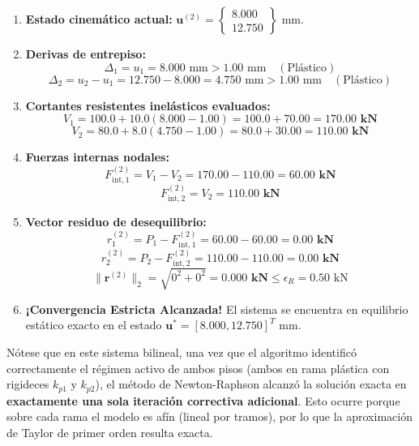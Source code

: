 \documentclass[11pt,letterpaper]{article}
\begin{document}
\begin{stepbox}
\begin{enumerate}
    \item \textbf{Estado cinemático actual:} $\mathbf{u}^{(2)} = \begin{Bmatrix} 8.000 \\ 12.750 \end{Bmatrix}\text{ mm}$.
    \item \textbf{Derivas de entrepiso:}
    \[
        \Delta_1 = u_1 = 8.000\text{ mm} > 1.00\text{ mm} \quad (\text{Plástico})
    \]
    \[
        \Delta_2 = u_2 - u_1 = 12.750 - 8.000 = 4.750\text{ mm} > 1.00\text{ mm} \quad (\text{Plástico})
    \]
    \item \textbf{Cortantes resistentes inelásticos evaluados:}
    \[
        V_1 = 100.0 + 10.0(8.000 - 1.00) = 100.0 + 70.00 = \mathbf{170.00\text{ kN}}
    \]
    \[
        V_2 = 80.0 + 8.0(4.750 - 1.00) = 80.0 + 30.00 = \mathbf{110.00\text{ kN}}
    \]
    \item \textbf{Fuerzas internas nodales:}
    \[
        F_{\text{int},1}^{(2)} = V_1 - V_2 = 170.00 - 110.00 = \mathbf{60.00\text{ kN}}
    \]
    \[
        F_{\text{int},2}^{(2)} = V_2 = \mathbf{110.00\text{ kN}}
    \]
    \item \textbf{Vector residuo de desequilibrio:}
    \[
        r_1^{(2)} = P_1 - F_{\text{int},1}^{(2)} = 60.00 - 60.00 = \mathbf{0.00\text{ kN}}
    \]
    \[
        r_2^{(2)} = P_2 - F_{\text{int},2}^{(2)} = 110.00 - 110.00 = \mathbf{0.00\text{ kN}}
    \]
    \[
        \|\mathbf{r}^{(2)}\|_2 = \sqrt{0^2 + 0^2} = \mathbf{0.000\text{ kN}} \le \epsilon_R = 0.50\text{ kN}
    \]
    \item \textbf{\color{uisgreen} ¡Convergencia Estricta Alcanzada!} El sistema se encuentra en equilibrio estático exacto en el estado $\mathbf{u}^* = [8.000, 12.750]^T\text{ mm}$.
\end{enumerate}
\end{stepbox}

\begin{alertbox}
Nótese que en este sistema bilineal, una vez que el algoritmo identificó correctamente el régimen activo de ambos pisos (ambos en rama plástica con rigideces $k_{p1}$ y $k_{p2}$), el método de Newton-Raphson alcanzó la solución exacta en \textbf{exactamente una sola iteración correctiva adicional}. Esto ocurre porque sobre cada rama el modelo es afín (lineal por tramos), por lo que la aproximación de Taylor de primer orden resulta exacta.
\end{alertbox}
\end{document}
